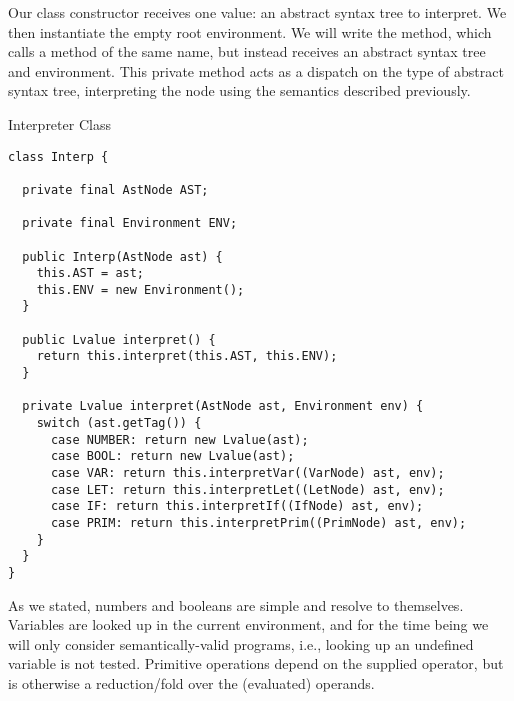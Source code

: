 Our  class constructor receives one value: an abstract syntax tree to interpret. We then instantiate the empty root environment. We will write the  method, which calls a  method of the same name, but instead receives an abstract syntax tree and environment. This private method acts as a dispatch on the type of abstract syntax tree, interpreting the node using the semantics described previously.

\begin{cl}{Interpreter Class}
\begin{lstlisting}[language=MyJava]
class Interp {

  private final AstNode AST;

  private final Environment ENV;

  public Interp(AstNode ast) {
    this.AST = ast;
    this.ENV = new Environment();
  }

  public Lvalue interpret() {
    return this.interpret(this.AST, this.ENV);
  }

  private Lvalue interpret(AstNode ast, Environment env) {
    switch (ast.getTag()) {
      case NUMBER: return new Lvalue(ast);
      case BOOL: return new Lvalue(ast);
      case VAR: return this.interpretVar((VarNode) ast, env); 
      case LET: return this.interpretLet((LetNode) ast, env);
      case IF: return this.interpretIf((IfNode) ast, env);
      case PRIM: return this.interpretPrim((PrimNode) ast, env);
    }
  }
}
\end{lstlisting}
\end{cl}
As we stated, numbers and booleans are simple and resolve to themselves. Variables are looked up in the current environment, and for the time being we will only consider semantically-valid programs, i.e., looking up an undefined variable is not tested. Primitive operations depend on the supplied operator, but is otherwise a reduction/fold over the (evaluated) operands. 
